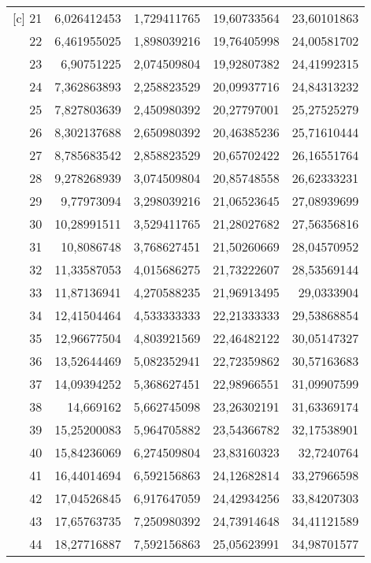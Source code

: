\begin{longtable}{r|rrrr}[c]
    21    & 6,026412453 & 1,729411765 & 19,60733564 & 23,60101863 \\
    22    & 6,461955025 & 1,898039216 & 19,76405998 & 24,00581702 \\
    23    & 6,90751225 & 2,074509804 & 19,92807382 & 24,41992315 \\
    24    & 7,362863893 & 2,258823529 & 20,09937716 & 24,84313232 \\
    25    & 7,827803639 & 2,450980392 & 20,27797001 & 25,27525279 \\
    26    & 8,302137688 & 2,650980392 & 20,46385236 & 25,71610444 \\
    27    & 8,785683542 & 2,858823529 & 20,65702422 & 26,16551764 \\
    28    & 9,278268939 & 3,074509804 & 20,85748558 & 26,62333231 \\
    29    & 9,77973094 & 3,298039216 & 21,06523645 & 27,08939699 \\
    30    & 10,28991511 & 3,529411765 & 21,28027682 & 27,56356816 \\
    31    & 10,8086748 & 3,768627451 & 21,50260669 & 28,04570952 \\
    32    & 11,33587053 & 4,015686275 & 21,73222607 & 28,53569144 \\
    33    & 11,87136941 & 4,270588235 & 21,96913495 & 29,0333904 \\
    34    & 12,41504464 & 4,533333333 & 22,21333333 & 29,53868854 \\
    35    & 12,96677504 & 4,803921569 & 22,46482122 & 30,05147327 \\
    36    & 13,52644469 & 5,082352941 & 22,72359862 & 30,57163683 \\
    37    & 14,09394252 & 5,368627451 & 22,98966551 & 31,09907599 \\
    38    & 14,669162 & 5,662745098 & 23,26302191 & 31,63369174 \\
    39    & 15,25200083 & 5,964705882 & 23,54366782 & 32,17538901 \\
    40    & 15,84236069 & 6,274509804 & 23,83160323 & 32,7240764 \\
    41    & 16,44014694 & 6,592156863 & 24,12682814 & 33,27966598 \\
    42    & 17,04526845 & 6,917647059 & 24,42934256 & 33,84207303 \\
    43    & 17,65763735 & 7,250980392 & 24,73914648 & 34,41121589 \\
    44    & 18,27716887 & 7,592156863 & 25,05623991 & 34,98701577 \\

\end{longtable}
